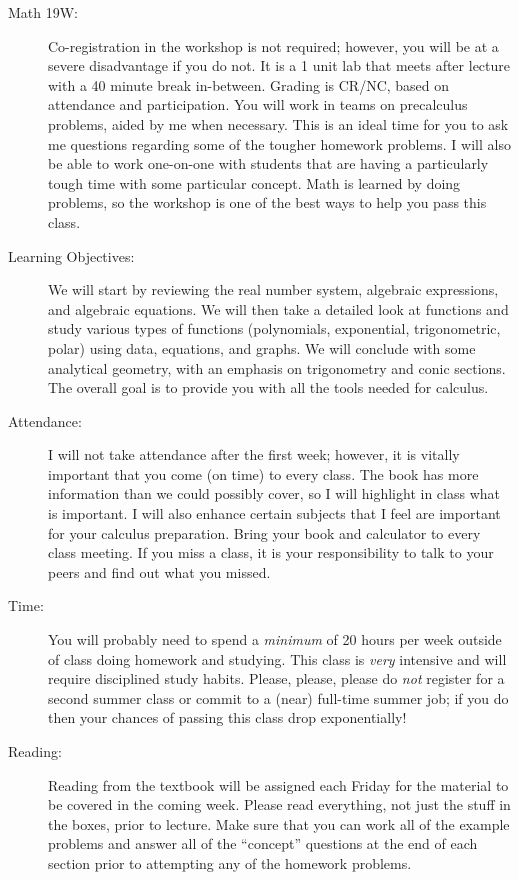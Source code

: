 \documentclass[letterpaper,12pt,fleqn]{article}
\begin{document}
\begin{description}
\item[Math 19W:] Co-registration in the workshop is not required; however, you
    will be at a severe disadvantage if you do not. It is a 1 unit lab that
    meets after lecture with a 40 minute break in-between. Grading is CR/NC,
    based on attendance and participation. You will work in teams on
    precalculus problems, aided by me when necessary. This is an ideal time for
    you to ask me questions regarding some of the tougher homework problems. I
    will also be able to work one-on-one with students that are having a
    particularly tough time with some particular concept.  Math is learned by
    doing problems, so the workshop is one of the best ways to help you pass
    this class.

\newpage

\item[Learning Objectives:] We will start by reviewing the real number system,
    algebraic expressions, and algebraic equations. We will then take a
    detailed look at functions and study various types of functions
    (polynomials, exponential, trigonometric, polar) using data, equations,
    and graphs. We will conclude with some analytical geometry, with an
    emphasis on trigonometry and conic sections. The overall goal is to
    provide you with all the tools needed for calculus.

\item[Attendance:] I will not take attendance after the first week; however, it
    is vitally important that you come (on time) to every class. The book has
    more information than we could possibly cover, so I will highlight in class
    what is important. I will also enhance certain subjects that I feel are
    important for your calculus preparation. Bring your book and calculator to
    every class meeting. If you miss a class, it is your responsibility to talk
    to your peers and find out what you missed.

\item[Time:] You will probably need to spend a \emph{minimum} of 20 hours per
    week outside of class doing homework and studying. This class is \emph{very}
    intensive and will require disciplined study habits. Please, please, please
    do \emph{not} register for a second summer class or commit to a (near)
    full-time summer job; if you do then your chances of passing this class
    drop exponentially!

\item[Reading:] Reading from the textbook will be assigned each Friday for the
    material to be covered in the coming week. Please read everything, not
    just the stuff in the boxes, prior to lecture. Make sure that you can work
    all of the example problems and answer all of the ``concept'' questions at
    the end of each section prior to attempting any of the homework problems.


\end{description}
\end{document}

